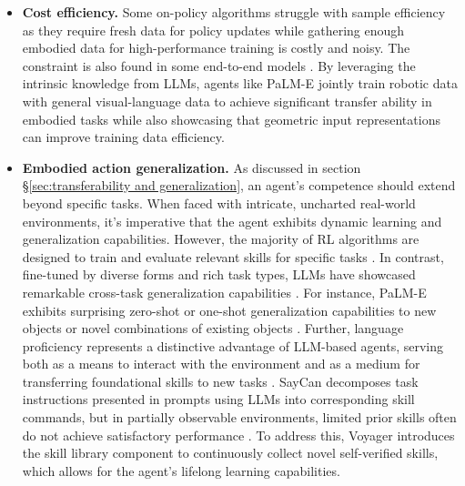 \begin{itemize}[leftmargin=*]
    \item \textbf{Cost efficiency.} 
    Some on-policy algorithms struggle with sample efficiency as they require fresh data for policy updates while gathering enough embodied data for high-performance training is costly and noisy. The constraint is also found in some end-to-end models \cite{DBLP:conf/cvpr/PuigRBLWF018, DBLP:journals/corr/abs-2011-13922, DBLP:journals/corr/abs-2108-04927}. By leveraging the intrinsic knowledge from LLMs, agents like PaLM-E \cite{DBLP:conf/icml/DriessXSLCIWTVY23} jointly train robotic data with general visual-language data to achieve significant transfer ability in embodied tasks while also showcasing that geometric input representations can improve training data efficiency.
    
    \item \textbf{Embodied action generalization.}
    As discussed in section \S \ref{sec:transferability and generalization}, an agent's competence should extend beyond specific tasks. When faced with intricate, uncharted real-world environments, it's imperative that the agent exhibits dynamic learning and generalization capabilities. However, the majority of RL algorithms are designed to train and evaluate relevant skills for specific tasks \cite{DBLP:journals/corr/abs-2212-04088, DBLP:journals/corr/abs-1911-05892, DBLP:journals/arc/TipaldiIM22, DBLP:conf/iccv/SavvaMPBKMZWJSL19}. In contrast, fine-tuned by diverse forms and rich task types, LLMs have showcased remarkable cross-task generalization capabilities \cite{longpre2023flan, wang2022self}. For instance, PaLM-E exhibits surprising zero-shot or one-shot generalization capabilities to new objects or novel combinations of existing objects \cite{DBLP:conf/icml/DriessXSLCIWTVY23}. Further, language proficiency represents a distinctive advantage of LLM-based agents, serving both as a means to interact with the environment and as a medium for transferring foundational skills to new tasks \cite{DBLP:conf/icra/LiangHXXHIFZ23}. SayCan \cite{DBLP:conf/corl/IchterBCFHHHIIJ22} decomposes task instructions presented in prompts using LLMs into corresponding skill commands, but in partially observable environments, limited prior skills often do not achieve satisfactory performance \cite{DBLP:journals/corr/abs-2212-04088}. To address this, Voyager \cite{DBLP:journals/corr/abs-2305-16291} introduces the skill library component to continuously collect novel self-verified skills, which allows for the agent's lifelong learning capabilities.
    

\end{itemize}
